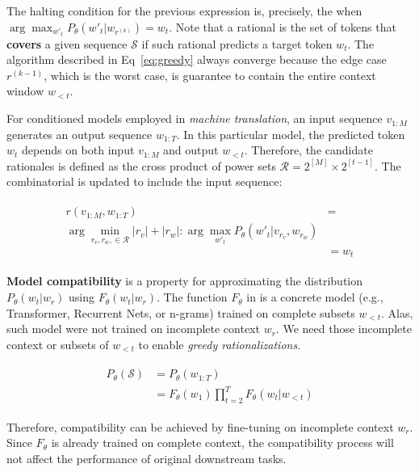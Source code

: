 The halting condition for the previous expression is, precisely, the  when $ \arg \max_{w'_t} P_{\theta}(w'_t|w_{r^{(k)}}) = w_t$.  Note that a rational is the set of tokens that \textbf{covers} a given sequence $\mathcal{S}$ if such rational predicts a target token $w_t$. The algorithm described in Eq~\ref{eq:greedy} always converge because the edge case $r^{(k-1)}$, which is the worst case, is guarantee to contain the entire context window $w_{<t}$. 

For conditioned models employed in \textit{machine translation}, an input sequence $v_{1:M}$ generates an output sequence $w_{1:T}$. In this particular model, the predicted token $w_t$ depends on both input $v_{1:M}$ and output $w_{<t}$. Therefore, the candidate rationales is defined as the cross product of power sets $\mathcal{R} = 2^{[M]}\times 2^{[t-1]}$. The combinatorial  is updated to include the input sequence:

\begin{align}
\begin{split}
r(v_{1:M},w_{1:T})  & = \\
\arg \min_{r_v,r_w, \in \mathcal{R}} |r_v| + |r_w| : \arg \max_{w'_t} P_{\theta}(w'_t|v_{r_v},w_{r_w}) \\
                    & = w_t
\end{split}
\label{eq:combinatorialMT}
\end{align}

\textbf{Model compatibility} is a property for approximating the distribution $P_{\theta}(w_t|w_r)$ using $F_{\theta}(w_t|w_r)$. The function $F_{\theta}$ in  is a concrete model (e.g., Transformer, Recurrent Nets, or n-grams) trained on complete subsets $w_{<t}$. Alas, such model were not trained on incomplete context $w_r$. We need those incomplete context or subsets of $w_{<t}$ to enable \textit{greedy rationalizations}.

\begin{align}
\begin{split}
P_{\theta}(\mathcal{S}) & = P_{\theta}(w_{1:T}) \\
                        & = F_{\theta}(w_1)\prod_{t = 2}^{T} F_{\theta}(w_t | w_{<t} )
\end{split}
\label{eq:llm2}
\end{align}

Therefore, compatibility can be achieved by fine-tuning on incomplete context $w_r$. Since $F_{\theta}$ is already trained on complete context, the compatibility process will not affect the performance of original downstream tasks. 

